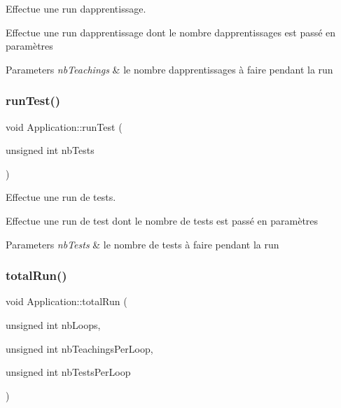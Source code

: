 Effectue une run d\textquotesingle{}apprentissage. 

Effectue une run d\textquotesingle{}apprentissage dont le nombre d\textquotesingle{}apprentissages est passé en paramètres 
\begin{DoxyParams}{Parameters}
{\em nb\+Teachings} & le nombre d\textquotesingle{}apprentissages à faire pendant la run \\
\hline
\end{DoxyParams}
\mbox{\label{classApplication_a2efd3cc253a127ea682a00b560f6d073}} 
\subsubsection{\texorpdfstring{run\+Test()}{runTest()}}
{\footnotesize\ttfamily void Application\+::run\+Test (\begin{DoxyParamCaption}\item[{unsigned int}]{nb\+Tests }\end{DoxyParamCaption})}



Effectue une run de tests. 

Effectue une run de test dont le nombre de tests est passé en paramètres 
\begin{DoxyParams}{Parameters}
{\em nb\+Tests} & le nombre de tests à faire pendant la run \\
\hline
\end{DoxyParams}
\mbox{\label{classApplication_a105d173f14e444ddb485d5ac5df91d74}} 
\subsubsection{\texorpdfstring{total\+Run()}{totalRun()}}
{\footnotesize\ttfamily void Application\+::total\+Run (\begin{DoxyParamCaption}\item[{unsigned int}]{nb\+Loops,  }\item[{unsigned int}]{nb\+Teachings\+Per\+Loop,  }\item[{unsigned int}]{nb\+Tests\+Per\+Loop }\end{DoxyParamCaption})}



